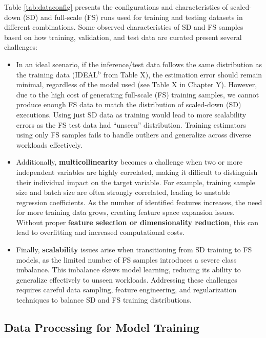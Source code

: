 Table \ref{tab:dataconfig} presents the configurations and characteristics of scaled-down (SD) and full-scale (FS) runs used for training and testing datasets in different combinations. 
Some observed characteristics of SD and FS samples based on how training, validation, and test data are curated present several challenges:
\begin{itemize}
    \item In an ideal scenario, if the inference/test data follows the same distribution as the training data (IDEAL$^{\mathrm{b}}$ from Table X), the estimation error should remain minimal, regardless of the model used (see Table X in Chapter Y). However, due to the high cost of generating full-scale (FS) training samples, we cannot produce enough FS data to match the distribution of scaled-down (SD) executions. Using just SD data as training would lead to more scalability errors as the FS test data had “unseen” distribution. Training estimators using only FS samples fails to handle outliers and generalize across diverse workloads effectively.
    \item Additionally, \textbf{multicollinearity} becomes a challenge when two or more independent variables are highly correlated, making it difficult to distinguish their individual impact on the target variable. For example, training sample size and batch size are often strongly correlated, leading to unstable regression coefficients. As the number of identified features increases, the need for more training data grows, creating feature space expansion issues. Without proper f\textbf{eature selection or dimensionality reduction}, this can lead to overfitting and increased computational costs.
    \item Finally, \textbf{scalability} issues arise when transitioning from SD training to FS models, as the limited number of FS samples introduces a severe class imbalance. This imbalance skews model learning, reducing its ability to generalize effectively to unseen workloads. Addressing these challenges requires careful data sampling, feature engineering, and regularization techniques to balance SD and FS training distributions.
\end{itemize}




\subsection{Data Processing for Model Training}

